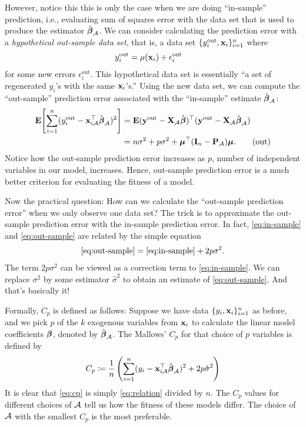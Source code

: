 \documentclass[a4paper]{article}
\begin{document}
However, notice this this is only the case when we are doing ``in-sample'' prediction, i.e.,
evaluating sum of squares error with the data set that is used to produce the estimator $\hat\bbeta_{\AA}$.
We can consider calculating the prediction error with a \emph{hypothetical out-sample data set},
that is, a data set $\{y_{i}^{\text{out}},\xx_{i}\}_{i=1}^{n}$ where
\begin{align*}
	y_{i}^{\text{out}} &= \mu(\xx_{i}) + \epsilon_{i}^{\text{out}}
\end{align*}
for some new errors $\epsilon_i^{\text{out}}$.
This hypothetical data set is essentially ``a set of regenerated $y_i$'s with the same $\xx_i$'s.''
Using the new data set,
we can compute the ``out-sample'' prediction error associated with the ``in-sample'' estimate $\hat\bbeta_{\AA}$:
\begin{align}\label{eq:out-sample}
	\E\!\left[ \sum_{i=1}^{n} ( y_{i}^{\text{out}} - \xx_{i\AA}\T\hat\bbeta_{\AA} )^{2} \right]
	&= \E (\yy^{\text{out}}-\XX_{\AA}\hat\bbeta)\T(\yy^{\text{out}}-\XX_{\AA}\hat\bbeta_{\AA}) \nonumber\\
	&= n\sigma^{2} + p\sigma^{2} + \mmu\T(\II_n-\PP_{\AA})\mmu. \tag{out}
\end{align}
Notice how the out-sample prediction error increases as $p$, number of independent variables in our model, increases.
Hence, out-sample prediction error is a much better criterion for evaluating the fitness of a model.

Now the practical question:
How can we calculate the ``out-sample prediction error'' when we only observe one data set?
The trick is to approximate the out-sample prediction error with the in-sample prediction error.
In fact, \eqref{eq:in-sample} and \eqref{eq:out-sample} are related by the simple equation
\begin{align}\label{eq:relation}
	\eqref{eq:out-sample} = \eqref{eq:in-sample} + 2p\sigma^2.
\end{align}
The term $2p\sigma^2$ can be viewed as a correction term to \eqref{eq:in-sample}.
We can replace $\sigma^{2}$ by some estimator $\hat\sigma^{2}$ to obtain an estimate of \eqref{eq:out-sample}.
And that's basically it!

\dinkus

\noindent
Formally, $C_{p}$ is defined as follows:
Suppose we have data $\{y_{i},\xx_{i}\}_{i=1}^{n}$ as before,
and we pick $p$ of the $k$ exogenous variables from $\xx_{i}$ to calculate the linear model coefficients $\bbeta$,
denoted by $\hat\bbeta_{\AA}$.
The Mallows' $C_{p}$ for that choice of $p$ variables is defined by
\begin{align}\label{eq:cp}
	C_{p} \coloneqq 
	\frac1n \left( \sum_{i=1}^{n} (y_{i}-\xx_{i\AA}\T\hat\bbeta_{\AA})^{2} + 2p\hat\sigma^{2} \right)
\end{align}
It is clear that \eqref{eq:cp} is simply \eqref{eq:relation} divided by $n$.
The $C_{p}$ values for different choices of $\AA$ tell us how the fitness of these models differ.
The choice of $\AA$ with the smallest $C_{p}$ is the most preferable.
\asDemonstrated

\end{document}
